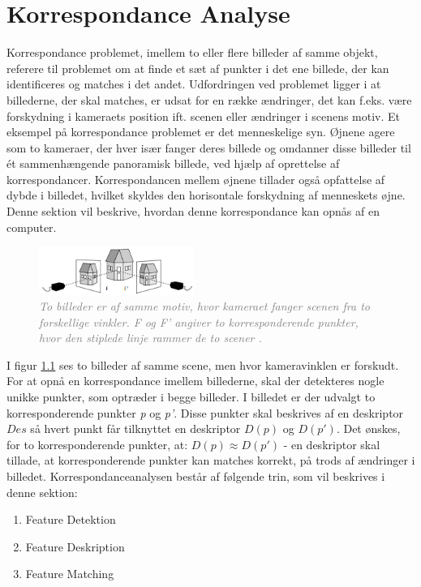 \chapter{Korrespondance Analyse} \label{sec:Kor}
Korrespondance problemet, imellem to eller flere billeder af samme objekt, referere til problemet om at finde et sæt af punkter i det ene billede, der kan identificeres og matches i det andet.
Udfordringen ved problemet ligger i at billederne, der skal matches, er udsat for en række ændringer, det kan f.eks. være forskydning i kameraets position ift. scenen eller  ændringer i scenens motiv. Et eksempel på korrespondance problemet er det menneskelige syn. Øjnene agere som to kameraer, der hver især fanger deres billede og omdanner disse billeder til ét sammenhængende panoramisk billede, ved hjælp af oprettelse af korrespondancer. Korrespondancen mellem øjnene tillader også opfattelse af dybde i billedet, hvilket skyldes den horisontale forskydning af menneskets øjne. Denne sektion vil beskrive, hvordan denne korrespondance kan opnås af en computer.
\begin{figure}[H]
    \centering
    \includegraphics[width=0.45\textwidth]{fig/3.png}
     \vspace{-1em}
    \begin{center}    
       \caption{\textcolor{gray}{\footnotesize \textit{To billeder er af samme motiv, hvor kameraet fanger scenen fra to forskellige vinkler. F og F' angiver to korresponderende punkter, hvor den stiplede linje rammer de to scener \cite{kim}.}}}
    \label{fig:1}
     \end{center}
     \vspace{-2.5em}
  \end{figure} \noindent
I figur \ref{fig:1} ses to billeder af samme scene, men hvor kameravinklen er forskudt. For at opnå en korrespondance imellem billederne, skal der detekteres nogle unikke punkter, som optræder i begge billeder. I billedet er der udvalgt to korresponderende punkter \textit{p} og \textit{p'}. Disse punkter skal beskrives af en deskriptor $Des$ så hvert punkt får tilknyttet en deskriptor $D(p)$ og $D(p')$. Det ønskes, for to korresponderende punkter, at: $D(p)\approx D(p')$ - en deskriptor skal tillade, at korresponderende punkter kan matches korrekt, på trods af ændringer i billedet. Korrespondanceanalysen består af følgende trin, som vil beskrives i denne sektion:
\begin{enumerate}
\item{Feature Detektion}
\item{Feature Deskription}
\item{Feature Matching}
\end{enumerate}


